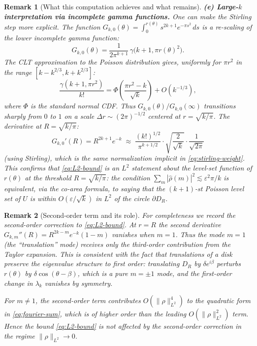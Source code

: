 \documentclass[a4paper,11pt,reqno]{amsart}
\newtheorem{remark}{Remark}[section]
\begin{document}
\begin{remark}[What this computation achieves and what remains]
\smallskip
\textbf{(e) Large-$k$ interpretation via incomplete gamma functions.}
One can make the Stirling step more explicit.  The function
$G_{k,0}(\theta)=\int_0^{r(\theta)}s^{2k+1}e^{-\pi s^2}\,ds$
is a re-scaling of the lower incomplete gamma function:
\[
G_{k,0}(\theta)=\frac{1}{2\pi^{k+1}}\,\gamma\!\bigl(k+1,\pi r(\theta)^2\bigr).
\]
The CLT approximation to the Poisson distribution gives, uniformly for
$\pi r^2$ in the range $[k-k^{2/3},k+k^{2/3}]$:
\[
\frac{\gamma(k+1,\pi r^2)}{k!}=\Phi\!\left(\frac{\pi r^2-k}{\sqrt{k}}\right)+O(k^{-1/3}),
\]
where $\Phi$ is the standard normal CDF.  Thus $G_{k,0}(\theta)/G_{k,0}(\infty)$
transitions sharply from $0$ to $1$ on a scale $\Delta r\sim(2\pi)^{-1/2}$ centered
at $r=\sqrt{k/\pi}$.  The derivative at $R=\sqrt{k/\pi}$:
\[
G_{k,0}'(R)=R^{2k+1}e^{-k}
\;\approx\;
\frac{(k!)^{1/2}}{\pi^{k+1/2}}
\cdot\sqrt{\frac{2}{\sqrt{k}}}\cdot\frac{1}{\sqrt{2\pi}}
\]
(using Stirling), which is the same normalization implicit in \eqref{eq:stirling-weight}.
This confirms that \eqref{eq:L2-bound} is an $L^2$ statement about the
level-set function of $r(\theta)$ at the threshold $R=\sqrt{k/\pi}$: the condition
$\sum_m|\hat\rho(m)|^2\lesssim\varepsilon^2\pi/k$ is equivalent, via the co-area formula,
to saying that the $(k+1)$-st Poisson level set of $U$ is within $O(\varepsilon/\sqrt{k})$
in $L^2$ of the circle $\partial D_R$.
\end{remark}

\begin{remark}[Second-order term and its role]
For completeness we record the second-order correction to \eqref{eq:L2-bound}.
At $r=R$ the second derivative $G_{k,m}''(R)=R^{2k-m}e^{-k}(1-m)$ vanishes when
$m=1$.  Thus the mode $m=1$ (the ``translation'' mode) receives only the
third-order contribution from the Taylor expansion.  This is consistent with the
fact that translations of a disk preserve the eigenvalue structure to first order:
translating $D_R$ by $\delta e^{i\beta}$ perturbs $r(\theta)$ by $\delta\cos(\theta-\beta)$,
which is a pure $m=\pm1$ mode, and the first-order change in $\lambda_k$ vanishes
by symmetry.

For $m\neq1$, the second-order term contributes $O(\|\rho\|_{L^2}^4)$ to the
quadratic form in \eqref{eq:fourier-sum}, which is of higher order than the
leading $O(\|\rho\|_{L^2}^2)$ term.  Hence the bound \eqref{eq:L2-bound}
is not affected by the second-order correction in the regime $\|\rho\|_{L^2}\to0$.
\end{remark}
\end{document}

